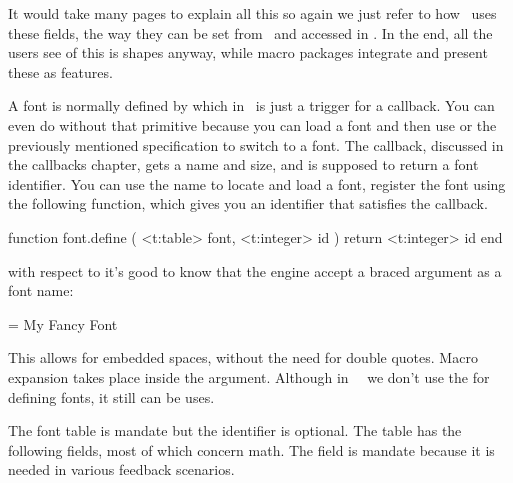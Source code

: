 {It would take many pages to explain all this so again we just refer to how
\CONTEXT\ uses these fields, the way they can be set from \TEX\ and accessed in
\LUA. In the end, all the users see of this is shapes anyway, while macro
packages integrate and present these as features.

\stopsection

\startsection[title={Loading}]

A font is normally defined by \type {\font} which in \LUAMETATEX\ is just a
trigger for a callback. You can even do without that primitive because you can
load a font and then use \type {\setfontid} or the previously mentioned
specification to switch to a font. The callback, discussed in the callbacks
chapter, gets a name and size, and is supposed to return a font identifier. You
can use the name to locate and load a font, register the font using the following
function, which gives you an identifier that satisfies the callback.

\starttyping [option=LUA]
function font.define ( <t:table> font, <t:integer> id )
    return <t:integer> id
end
\stoptyping

with respect to \type {\font} it's good to know that the engine accept a braced
argument as a font name:

\starttyping[option=TEX]
\font\myfont = {My Fancy Font}
\stoptyping

This allows for embedded spaces, without the need for double quotes. Macro
expansion takes place inside the argument. Although in \CONTEXT\ \LMTX\ we don't
use the \type {\font} for defining fonts, it still can be uses.

The font table is mandate but the identifier is optional. The table has the
following fields, most of which concern math. The  field is mandate
because it is needed in various feedback scenarios.


}
